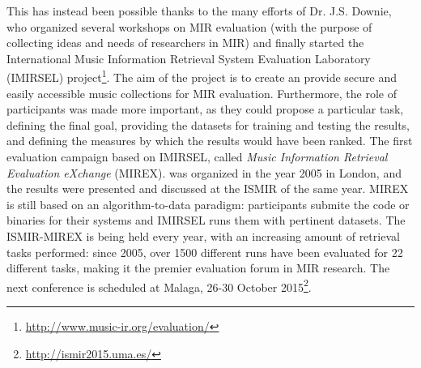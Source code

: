 This has instead been possible thanks to the many efforts of Dr. J.S. Downie, who organized several workshops on MIR evaluation (with the purpose of collecting ideas and needs of researchers in MIR) and finally started the International Music Information Retrieval System Evaluation Laboratory (IMIRSEL) project\footnote{\url{http://www.music-ir.org/evaluation/}}. The aim of the project is to create an provide secure and easily accessible music collections for MIR evaluation. Furthermore, the role of participants was made more important, as they could propose a particular task, defining the final goal, providing the datasets for training and testing the results, and defining the measures by which the results would have been ranked. The first evaluation campaign based on IMIRSEL, called \textit{Music Information Retrieval Evaluation eXchange} (MIREX). was organized in the year 2005 in London, and the results were presented and discussed at the ISMIR of the same year. MIREX is still based on an algorithm-to-data paradigm: participants submite the code or binaries for their systems and IMIRSEL runs them with pertinent datasets. The ISMIR-MIREX is being held every year, with an increasing amount of retrieval tasks performed: since 2005, over 1500 different runs have been evaluated for 22 different tasks, making it the premier evaluation forum in MIR research. The next conference is scheduled at Malaga, 26-30 October 2015\footnote{\url{http://ismir2015.uma.es/}}. 

